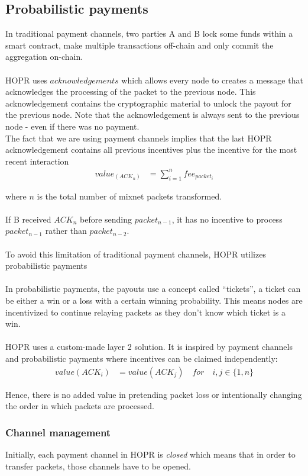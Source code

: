 \subsection{Probabilistic payments}
In traditional payment channels, two parties A and B lock some funds within a smart contract, make multiple transactions off-chain and only commit the aggregation on-chain.
\\~\\HOPR uses $acknowledgements$ which allows every node to creates a message that acknowledges the processing of the packet to the previous node. This acknowledgement contains the cryptographic material to unlock the payout for the previous node. Note that the acknowledgement is always sent to the previous node - even if there was no payment.
\\The fact that we are using payment channels implies that the last HOPR acknowledgement contains all previous incentives plus the incentive for the most recent interaction
\begin{align}  
value_(ACK_n) &=\sum_{i=1}^nfee_{packet_i}
     \end{align}

 where $n$ is the total number of mixnet packets transformed.
\\~\\If B received $ACK_n$ before sending $packet_{n-1}$, it has no incentive to process $packet_{n-1}$ rather than $packet_{n-2}$.
\\~\\To avoid this limitation of traditional payment channels, HOPR utilizes probabilistic payments
\\~\\In probabilistic payments, the payouts use a concept called “tickets”, a ticket can be either a win or a loss with a certain winning probability. This means nodes are incentivized to continue relaying packets as they don’t know which ticket is a win.
\\~\\HOPR uses a custom-made layer 2 solution. It is inspired by payment channels and probabilistic payments where incentives can be claimed independently:
\begin{align}  
 value ( ACK_i )  &  =value ( ACK_j ) \quad for \quad i,j\in \{1,n\}
         \end{align}

Hence, there is no added value in pretending packet loss or intentionally changing the order in which packets are processed.
\subsubsection{Channel management}
Initially, each payment channel in HOPR is \textit{closed} which means that in order to transfer packets, those channels have to be opened.
